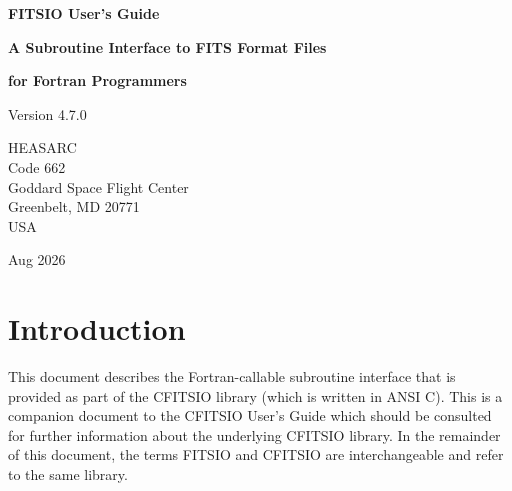 \documentclass[11pt]{book}
\begin{document}

\begin{titlepage}
\normalsize
\vspace*{4.6cm}
\begin{center}
{\Huge \bf FITSIO User's Guide}\\
\end{center}
\medskip 
\medskip
\begin{center}
{\LARGE \bf A Subroutine Interface to FITS Format Files}\\
\end{center}
\begin{center}
{\LARGE \bf for Fortran Programmers}\\
\end{center}
\medskip
\medskip
\begin{center}
{\Large Version 4.7.0\\}
\end{center}
\bigskip
\vskip 2.5cm
\begin{center}
{HEASARC\\
Code 662\\
Goddard Space Flight Center\\
Greenbelt, MD 20771\\
USA}
\end{center}

\vfill
\bigskip
\begin{center}
{\Large Aug 2026\\}
\end{center}
\vfill
\end{titlepage}

\clearpage

\tableofcontents

\chapter{Introduction }

This document describes the Fortran-callable subroutine interface that
is provided as part of the CFITSIO library (which is written in ANSI
C).  This is a companion document to the CFITSIO User's Guide which
should be consulted for further information about the underlying
CFITSIO library.  In the remainder of this document, the terms FITSIO
and CFITSIO are interchangeable and refer to the same library.
\end{document}
